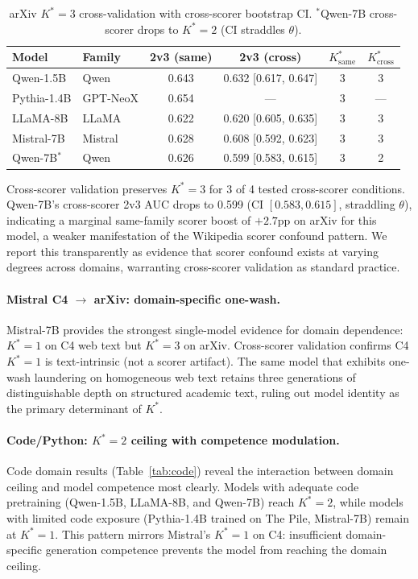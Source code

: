 \documentclass[11pt,a4paper]{article}
\begin{document}
\begin{table}[t]
\centering
\small
\caption{arXiv $K^*\!=\!3$ cross-validation with cross-scorer bootstrap CI. $^*$Qwen-7B cross-scorer drops to $K^*\!=\!2$ (CI straddles $\theta$).}
\label{tab:arxiv}
\begin{tabular}{llcccc}
\toprule
Model & Family & 2v3 (same) & 2v3 (cross) & $K^*_{\text{same}}$ & $K^*_{\text{cross}}$ \\
\midrule
Qwen-1.5B  & Qwen    & 0.643 & 0.632 [0.617, 0.647] & 3 & 3 \\
Pythia-1.4B & GPT-NeoX & 0.654 &  ---  & 3 &  --- \\
LLaMA-8B   & LLaMA   & 0.622 & 0.620 [0.605, 0.635] & 3 & 3 \\
Mistral-7B & Mistral & 0.628 & 0.608 [0.592, 0.623] & 3 & 3 \\
Qwen-7B$^*$ & Qwen   & 0.626 & 0.599 [0.583, 0.615] & 3 & 2 \\
\bottomrule
\end{tabular}
\end{table}

Cross-scorer validation preserves $K^*\!=\!3$ for 3 of 4 tested cross-scorer conditions. Qwen-7B's cross-scorer 2v3 AUC drops to 0.599 (CI $[0.583, 0.615]$, straddling $\theta$), indicating a marginal same-family scorer boost of $+2.7$pp on arXiv for this model, a weaker manifestation of the Wikipedia scorer confound pattern. We report this transparently as evidence that scorer confound exists at varying degrees across domains, warranting cross-scorer validation as standard practice.

\paragraph{Mistral C4 $\to$ arXiv: domain-specific one-wash.}\label{sec:mistral}
Mistral-7B provides the strongest single-model evidence for domain dependence: $K^*\!=\!1$ on C4 web text but $K^*\!=\!3$ on arXiv. Cross-scorer validation confirms C4 $K^*\!=\!1$ is text-intrinsic (not a scorer artifact). The same model that exhibits one-wash laundering on homogeneous web text retains three generations of distinguishable depth on structured academic text, ruling out model identity as the primary determinant of $K^*$.

\paragraph{Code/Python: $K^*\!=\!2$ ceiling with competence modulation.}\label{sec:code}
Code domain results (Table~\ref{tab:code}) reveal the interaction between domain ceiling and model competence most clearly. Models with adequate code pretraining (Qwen-1.5B, LLaMA-8B, and Qwen-7B) reach $K^*\!=\!2$, while models with limited code exposure (Pythia-1.4B trained on The Pile, Mistral-7B) remain at $K^*\!=\!1$. This pattern mirrors Mistral's $K^*\!=\!1$ on C4: insufficient domain-specific generation competence prevents the model from reaching the domain ceiling.
\end{document}
